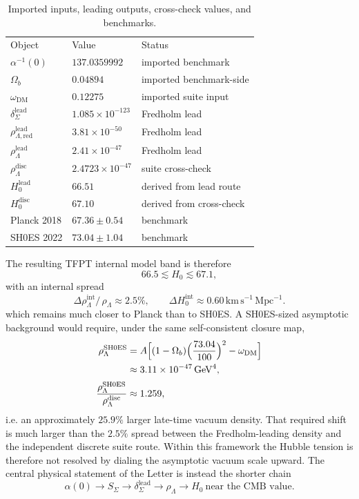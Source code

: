 \documentclass[aps,prl,reprint,superscriptaddress,longbibliography,nofootinbib,floatfix]{revtex4-2}
\newcommand{\Seam}{\Sigma}
\newcommand{\rhoLambda}{\rho_{\Lambda}}
\newcommand{\rhoLambdaRed}{\rho_{\Lambda,\mathrm{red}}}
\newcommand{\omegadm}{\omega_{\mathrm{DM}}}
\begin{document}
\begin{table}[b]
\small
\caption{Imported inputs, leading outputs, cross-check values, and benchmarks.}
\begin{ruledtabular}
\begin{tabular}{lll}
Object & Value & Status \\
$\alpha^{-1}(0)$ & $137.0359992$ & imported benchmark \\
$\Omega_b$ & $0.04894$ & imported benchmark-side \\
$\omegadm$ & $0.12275$ & imported suite input \\
$\delta_{\Seam}^{\mathrm{lead}}$ & $1.085\times10^{-123}$ & Fredholm lead \\
$\rhoLambdaRed^{\mathrm{lead}}$ & $3.81\times10^{-50}$ & Fredholm lead \\
$\rhoLambda^{\mathrm{lead}}$ & $2.41\times10^{-47}$ & Fredholm lead \\
$\rhoLambda^{\mathrm{disc}}$ & $2.4723\times10^{-47}$ & suite cross-check \\
$H_0^{\mathrm{lead}}$ & $66.51$ & derived from lead route \\
$H_0^{\mathrm{disc}}$ & $67.10$ & derived from cross-check \\
Planck 2018 & $67.36\pm0.54$ & benchmark \\
SH0ES 2022 & $73.04\pm1.04$ & benchmark \\
\end{tabular}
\end{ruledtabular}
\label{tab:claim-surface}
\end{table}

The resulting TFPT internal model band is therefore
\[
66.5 \lesssim H_0 \lesssim 67.1,
\]
with an internal spread
\[
\Delta\rho_\Lambda^{\mathrm{int}}\!/\,\rho_\Lambda
\approx 2.5\%,
\qquad
\Delta H_0^{\mathrm{int}}
\approx 0.60\,\mathrm{km\,s^{-1}\,Mpc^{-1}}.
\]
which remains much closer to Planck than to SH0ES. A SH0ES-sized asymptotic background would require, under the same self-consistent closure map,
\begin{equation}
\begin{aligned}
\rhoLambda^{\mathrm{SH0ES}}
&=
A\Bigl[(1-\Omega_b)\Bigl(\frac{73.04}{100}\Bigr)^2-\omegadm\Bigr]\\
&\approx
3.11\times10^{-47}\,\mathrm{GeV}^4,\\[2pt]
\frac{\rhoLambda^{\mathrm{SH0ES}}}{\rhoLambda^{\mathrm{disc}}}
&\approx
1.259,
\end{aligned}
\label{eq:sh0es-ratio}
\end{equation}
i.e. an approximately $25.9\%$ larger late-time vacuum density. That required shift is much larger than the $2.5\%$ spread between the Fredholm-leading density and the independent discrete suite route. Within this framework the Hubble tension is therefore not resolved by dialing the asymptotic vacuum scale upward. The central physical statement of the Letter is instead the shorter chain
\[
\alpha(0)
\longrightarrow
S_{\Seam}
\longrightarrow
\delta_{\Seam}^{\mathrm{lead}}
\longrightarrow
\rhoLambda
\longrightarrow
H_0 \ \text{near the CMB value}.
\]
\end{document}
